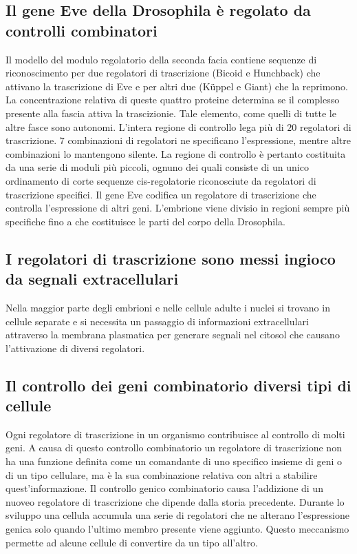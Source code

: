 \subsection{Il gene Eve della Drosophila \`e regolato da controlli combinatori}
Il modello del modulo regolatorio della seconda facia contiene sequenze di riconoscimento per due regolatori di trascrizione (Bicoid e Hunchback) che attivano la trascrizione di Eve e 
per altri due (K\"uppel e Giant) che la reprimono. La concentrazione relativa di queste quattro proteine determina se il complesso presente alla fascia attiva la trascizionie. Tale 
elemento, come quelli di tutte le altre fasce sono autonomi. L'intera regione di controllo lega pi\`u di $20$ regolatori di trascrizione. $7$ combinazioni di regolatori ne specificano
l'espressione, mentre altre combinazioni lo mantengono silente. La regione di controllo \`e pertanto costituita da una serie di moduli pi\`u piccoli, ognuno dei quali consiste di un
unico ordinamento di corte sequenze cis-regolatorie riconosciute da regolatori di trascrizione specifici. Il gene Eve codifica un regolatore di trascrizione che controlla l'espressione
di altri geni. L'embrione viene divisio in regioni sempre pi\`u specifiche fino a che costituisce le parti del corpo della Drosophila. 
\subsection{I regolatori di trascrizione sono messi ingioco da segnali extracellulari}
Nella maggior parte degli embrioni e nelle cellule adulte i nuclei si trovano in cellule separate e si necessita un passaggio di informazioni extracellulari attraverso la membrana
plasmatica per generare segnali nel citosol che causano l'attivazione di diversi regolatori. 
\subsection{Il controllo dei geni combinatorio diversi tipi di cellule}
Ogni regolatore di trascrizione in un organismo contribuisce al controllo di molti geni. A causa di questo controllo combinatorio un regolatore di trascrizione non ha una funzione 
definita come un comandante di uno specifico insieme di geni o di un tipo cellulare, ma \`e la sua combinazione relativa con altri a stabilire quest'informazione. Il controllo genico
combinatorio causa l'addizione di un nuoveo regolatore di trascrizione che dipende dalla storia precedente. Durante lo sviluppo una cellula accumula una serie di regolatori che
ne alterano l'espressione genica solo quando l'ultimo membro presente viene aggiunto. Questo meccanismo permette ad alcune cellule di convertire da un tipo all'altro. 
